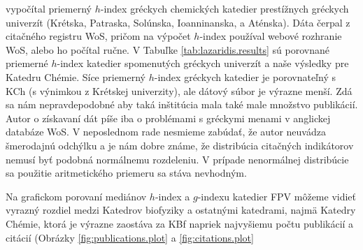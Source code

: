 \citet{Lazaridis2010} vypočítal priemerný $h$-index gréckych chemických
katedier prestížnych gréckych univerzít (Krétska, Patraska, Solúnska,
Ioanninanska, a Aténska).  Dáta čerpal z citačného registru WoS, pričom na
výpočet $h$-index používal webové rozhranie WoS, alebo ho počítal ručne. V
Tabuľke \ref{tab:lazaridis.results} sú porovnané priemerné $h$-index katedier
spomenutých gréckych univerzít a naše výsledky pre Katedru Chémie. Síce
priemerný $h$-index gréckych katedier je porovnateľný s KCh (s výnimkou z
Krétskej univerzity), ale dátový súbor je výrazne menší. Zdá sa nám
nepravdepodobné aby taká inštitúcia mala také male množstvo publikácií.  Autor
o získavaní dát píše iba o problémami s gréckymi menami v anglickej databáze
WoS. V neposlednom rade nesmieme zabúdať, že autor neuvádza šmerodajnú odchýlku
a je nám dobre známe, že distribúcia citačných indikátorov nemusí byť podobná
normálnemu rozdeleniu. V prípade nenormálnej distribúcie sa použitie
aritmetického priemeru sa stáva nevhodným.

Na grafickom porovaní mediánov $h$-index a $g$-indexu katedier FPV môžeme vidieť
vyrazný rozdiel medzi Katedrov biofyziky a ostatnými katedrami, najmä Katedry
Chémie, ktorá je výrazne zaostáva za KBf napriek najvyšiemu počtu publikácií
a citácií (Obrázky \ref{fig:publications.plot} a \ref{fig:citations.plot}

